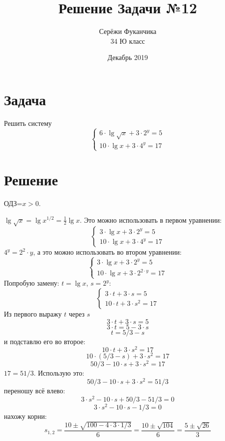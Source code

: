 \documentclass{article}
\title{Решение Задачи №12}
\author{Серёжи Фуканчика\\34 Ю класс}
\date{Декабрь 2019}
\begin{document}
\maketitle

\section{Задача}
Решить систему
\begin{equation*}
    \begin{cases}
    6\cdot\lg{\sqrt{x}}+3\cdot{}2^y=5 \\ 10\cdot\lg{x}+3\cdot{}4^y=17
    \end{cases}
\end{equation*}

\section{Решение}
ОДЗ=$x>0$.

$\lg{\sqrt{x}}=\lg{x^{1/2}}=\frac{1}{2}\lg{x}$. Это можно использовать в первом уравнении:
\begin{equation*}
    \begin{cases}
    3\cdot\lg{x}+3\cdot{}2^y=5 \\ 10\cdot\lg{x}+3\cdot{}4^y=17
    \end{cases}
\end{equation*}
$4^y=2^2\cdot{}y$, а это можно использовать во втором уравнении:
\begin{equation*}
    \begin{cases}
    3\cdot\lg{x}+3\cdot{}2^y=5 \\ 10\cdot\lg{x}+3\cdot{}2^{2\cdot{}y}=17
    \end{cases}
\end{equation*}
Попробую замену: $t=\lg{x}$, $s=2^y$:
\begin{equation*}
    \begin{cases}
    3\cdot{}t+3\cdot{}s=5 \\ 10\cdot{}t+3\cdot{}s^2=17
    \end{cases}
\end{equation*}
Из первого выражу $t$ через $s$
$$3\cdot{}t+3\cdot{}s=5$$
$$3\cdot{}t=5-3\cdot{}s$$
$$t=5/3-s$$
и подставлю его во второе:
$$10\cdot{}t+3\cdot{}s^2=17$$
$$10\cdot{}(5/3-s)+3\cdot{}s^2=17$$
$$50/3-10\cdot{}s+3\cdot{}s^2=17$$
$17=51/3$. Использую это:
$$50/3-10\cdot{}s+3\cdot{}s^2=51/3$$
переношу всё влево:
$$3\cdot{}s^2-10\cdot{}s+50/3-51/3=0$$
$$3\cdot{}s^2-10\cdot{}s-1/3=0$$
нахожу корни:
$$s_{1,2}=\frac{10\pm{}\sqrt{100-4\cdot{}3\cdot{}1/3}}{6}=\frac{10\pm{}\sqrt{104}}{6}=\frac{5\pm{}\sqrt{26}}{3}$$
\end{document}
